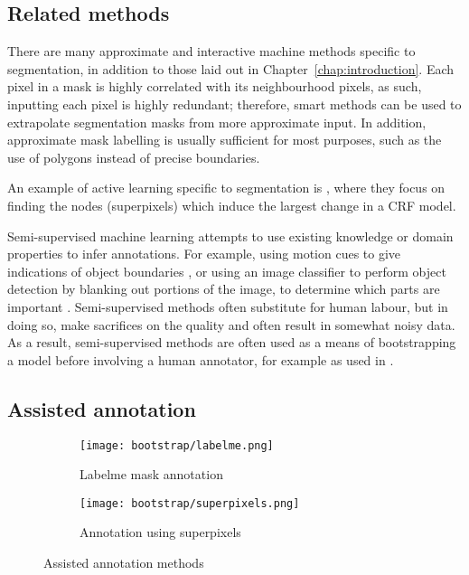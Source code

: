 \subsection{Related methods}

There are many approximate and interactive machine methods specific to segmentation, in addition to those laid out in Chapter~\ref{chap:introduction}. Each pixel in a mask is highly correlated with its neighbourhood pixels, as such, inputting each pixel is highly redundant; therefore, smart methods can be used to extrapolate segmentation masks from more approximate input. In addition, approximate mask labelling is usually sufficient for most purposes, such as the use of polygons instead of precise boundaries.

An example of active learning specific to segmentation is \cite{Xu2017}, where they focus on finding the nodes (superpixels) which induce the largest change in a \gls{CRF} model.

Semi-supervised machine learning attempts to use existing knowledge or domain properties to infer annotations. For example, using motion cues to give indications of object boundaries \cite{Hong2017}, or using an image classifier to perform object detection by blanking out portions of the image, to determine which parts are important \cite{Bazzani2016}. Semi-supervised methods often substitute for human labour, but in doing so, make sacrifices on the quality and often result in somewhat noisy data. As a result, semi-supervised methods are often used as a means of bootstrapping a model before involving a human annotator, for example as used in \cite{Papadopoulos2016}.


\subsection {Assisted annotation}


\begin{figure}[ht]
\centering
\begin{subfigure}{.5\textwidth}
  \centering
  \texttt{[image: bootstrap/labelme.png]}
  \caption{Labelme mask annotation}  
  \label{fig:bootstrap_labelme}
\end{subfigure}%
\begin{subfigure}{.5\textwidth}
  \centering
  \texttt{[image: bootstrap/superpixels.png]}
  \caption{Annotation using superpixels}
  \label{fig:bootstrap_superpixels}
\end{subfigure}

\caption{Assisted annotation methods}
\label{fig:bootstrap_annot_method}
\end{figure}


